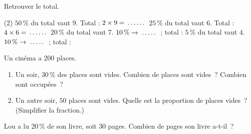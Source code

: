 \documentclass[a4paper,11pt,fleqn]{article}
\newcommand{\pt}[1][1.6cm]{\makebox[#1]{\dotfill}}
\newcommand{\ligne}{\par\smallskip\makebox[\linewidth]{\dotfill}\par}
\begin{document}
\begin{EXO}{}{}
Retrouver le total.

\begin{tasks}[label=\textbf{\alph*.}, item-indent=2em, after-item-skip=0.5em](2)
	\task $50\,\%$ du total vaut $9$. \quad Total : $2 \times 9 = \pt[1cm]$
	\task $25\,\%$ du total vaut $6$. \quad Total : $4 \times 6 = \pt[1cm]$
	\task* $20\,\%$ du total vaut $7$. \quad $10\,\% \to \pt[0.9cm]$ ; \enspace total : \pt[0.9cm]
	\task* $5\,\%$ du total vaut $4$. \quad $10\,\% \to \pt[0.9cm]$ ; \enspace total : \pt[0.9cm]
\end{tasks}
\end{EXO}

\begin{EXO}{}{}
Un cinéma a $200$ places.
\begin{enumerate}[itemsep=0.3em]
	\item Un soir, $30\,\%$ des places sont vides. Combien de places sont vides~? Combien sont occupées~?
	\ligne
	\item Un autre soir, $50$ places sont vides. Quelle est la proportion de places vides~? (Simplifier la fraction.)
	\ligne
\end{enumerate}
\end{EXO}

\begin{EXO}{}{}
Lou a lu $20\,\%$ de son livre, soit $30$ pages. Combien de pages son livre a-t-il~?
\ligne
\end{EXO}

\ifdefined\ELEVE\else
\clearpage
\end{document}
